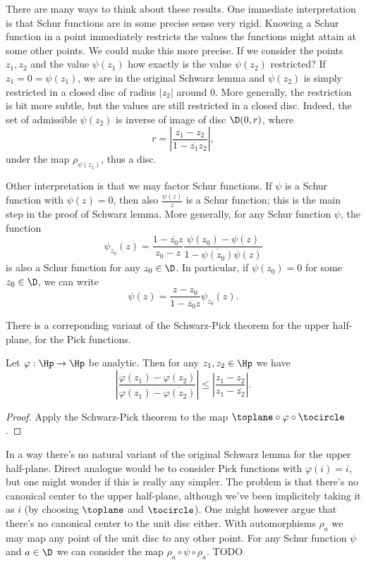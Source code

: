 There are many ways to think about these results. One immediate interpretation is that Schur functions are in some precise sense very rigid. Knowing a Schur function in a point immediately restricts the values the functions might attain at some other points. We could make this more precise. If we consider the points $z_{1}, z_{2}$ and the value $\psi(z_{1})$ how exactly is the value $\psi(z_{2})$ restricted? If $z_{1} = 0 = \psi(z_{1})$, we are in the original Schwarz lemma and $\psi(z_{2})$ is simply restricted in a closed disc of radius $|z_{2}|$ around $0$. More generally, the restriction is bit more subtle, but the values are still restricted in a closed disc. Indeed, the set of admissible $\psi(z_{2})$ is inverse of image of disc $\D(0, r)$, where
\[
	r = \left|\frac{z_{1} - z_{2}}{1 - \overline{z_{1}}z_{2}}\right|,
\]
under the map $\rho_{\psi(z_{1})}$, thus a disc.

Other interpretation is that we may factor Schur functions. If $\psi$ is a Schur function with $\psi(z) = 0$, then also $\frac{\psi(z)}{z}$ is a Schur function; this is the main step in the proof of Schwarz lemma. More generally, for any Schur function $\psi$, the function
\[
	\psi_{z_{0}}(z) = \frac{1 - \overline{z_{0}}z}{z_{0} - z} \frac{\psi(z_{0}) - \psi(z)}{1 - \overline{\psi(z_{0})} \psi(z)}
\]
is also a Schur function for any $z_{0} \in \D$. In particular, if $\psi(z_{0}) = 0$ for some $z_{0} \in \D$, we can write
\[
	\psi(z) = \frac{z - z_{0}}{1 - \overline{z_{0}} z} \psi_{z_{0}}(z).
\]

There is a correponding variant of the Schwarz-Pick theorem for the upper half-plane, for the Pick functions.

\begin{lause}
	Let $\varphi : \Hp \to \Hp$ be analytic. Then for any $z_{1}, z_{2} \in \Hp$ we have
	\[
		\left|\frac{\varphi(z_{1}) - \varphi(z_{2})}{\varphi(z_{1}) - \overline{\varphi(z_{2})}} \right| \leq \left|\frac{z_{1} - z_{2}}{z_{1} - \overline{z_{2}}} \right|.
	\]
\end{lause}

\begin{proof}
	Apply the Schwarz-Pick theorem to the map $\toplane \circ \varphi \circ \tocircle$.
\end{proof}

In a way there's no natural variant of the original Schwarz lemma for the upper half-plane. Direct analogue would be to consider Pick functions with $\varphi(i) = i$, but one might wonder if this is really any simpler. The problem is that there's no canonical center to the upper half-plane, although we've been implicitely taking it as $i$ (by choosing $\toplane$ and $\tocircle$). One might however argue that there's no canonical center to the unit disc either. With automorphisms $\rho_{a}$ we may map any point of the unit disc to any other point. For any Schur function $\psi$ and $a \in \D$ we can consider the map $\rho_{a} \circ \psi \circ \rho_{a}$. TODO

